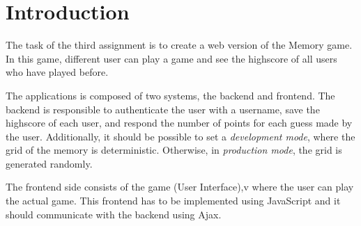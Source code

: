 \section{Introduction}\label{sec:01_intro}
The task of the third assignment is to create a web version of the Memory game. In this game, different user can play a game and see the highscore of all users who have played before.

The applications is composed of two systems, the backend and frontend.
The backend is responsible to authenticate the user with a username, save the highscore of each user, and respond the number of points for each guess made by the user. Additionally, it should be possible to set a \textit{development mode}, where the grid of the memory is deterministic. Otherwise, in \textit{production mode}, the grid is generated randomly.

The frontend side consists of the game (User Interface),v where the user can play the actual game. This frontend has to be implemented using JavaScript and it should communicate with the backend using Ajax.